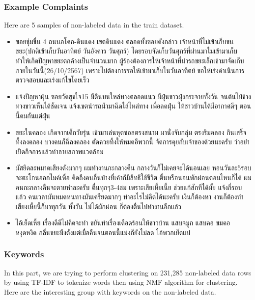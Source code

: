 \documentclass[12pt, a4paper]{article}
\begin{document}
                \subsubsection{Example Complaints}
                    Here are 5 samples of non-labeled data in the train dataset.
                    \begin{itemize}
                        \item ซอยชุ่มชื่น 4 ถนนอโศก-ดินแดง เขตดินแดง ตลอดทั้งซอยดังกล่าว เจ้าหน้าที่ไม่เข้าเก็บขนขยะ(ปกติเข้าเก็บวันอาทิตย์ วันอังคาร วันศุกร์)
                        โดยรอบจัดเก็บวันศุกร์ที่ผ่านมาไม่เข้ามาเก็บ ทำให้เกิดปัญหาขยะตกค้างเป็นจำนวนมาก ผู้ร้องต้องการให้เจ้าหน้าที่นำรถขยะเล็กเข้ามาจัดเก็บภายในวันนี้(26/10/2567)
                        เพราะไม่ต้องการรอให้เข้ามาเก็บในวันอาทิตย์ ขอให้เร่งดำเนินการตรวจสอบและเร่งแก้ไขโดยเร็ว
                        \item แจ้งปัญหาฝุ่น ซอยวัดสุขใจ15 มีดินบนใหล่ทางตลอดแนว มีฝุ่นขาวฝุ่งกระจายทั้งวัน จนต้นไม้ข้างทางขาวเห็นได้ชัดเจน
                        แจ้งเขตนำรถน้ำมาฉีดไล่ไหล่ทาง เพื่อลดฝุ่น ให้ชาวบ้านได้มีอากาศดีๆ ตอนนี้ดมกันแต่ฝุ่น
                        \item ขยะในคลอง เกิดจากเด็กวัยรุ่น เข้ามาเล่นหุตซอลตรงสนาม มานั่งจับกลุ่ม ตรงริมคลอง กินเสร็จทื้งลงคลอง บางคนก็ฉี่ลงคลอง ตัดควยทิ้งให้หมดอีพวกนี้
                        จัดการคุยกับเจ้าของด้วยนะครับ ว่าอย่าเปิดกิจการแล้วทำลายสภาพแวดล้อม
                        \item มัสยิดละหมาดเสียงดังมากๆ ผมทำงานกะกลางคืน กลางวันก็ไม่เคยจะได้นอนเลย หอนวันละ5รอบ จะตะโกนออกไมค์เพื่อ คิดถึงคนอื่นบ้างที่เค้าก็มีสิทธิใช้ชีวิต
                        ตื่นหรือนอนพักผ่อนตอนไหนก็ได้ ผมคนกะกลางคืนจะตายห่าละครับ ตื่นทุกๆ3-4ชม เพราะเสียเหี้ยเนี้ย ช่วยแก้สักทีได้มั้ย แจ้งกี่รอบแล้ว คนเวลามันหมดหนทางมันเครียดมากๆ
                        ทำอะไรไม่คิดได้นะครับ เงินก็ต้องหา งานก็ต้องทำ เสียงเหี้ยนี้ก็มาทุกวัน ทั้งวัน ไม่ได้ผักผ่อน ก็ต้องตื่นไปทำงานอีกแล้ว
                        \item ไอ้เย็ดเหี้ย เรื่องดีดีไม่คิดจะทำ ขยันทำเรื่องเดือดร้อนให้ชาวบ้าน แสบจมูก แสบคอ ขมคอ หงุดหงิด
                        กลิ่นขยะมึงตั้งแต่เมื่อคืนจนตอนนี้แม่งก็ยังไม่ลด ไอ้พวกเย็ดแม่
                    \end{itemize}

                \subsubsection{Keywords}
                    In this part, we are trying to perform clustering on 231,285 non-labeled data rows by using TF-IDF to tokenize words
                    then using NMF algorithm for clustering. Here are the interesting group with keywords on the non-labeled data.
\end{document}
